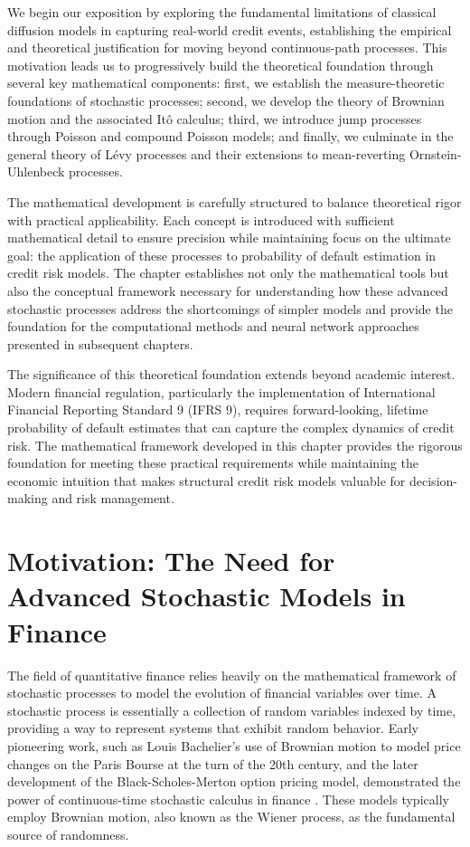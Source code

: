 \documentclass[11pt,twoside,openright]{report}
\begin{document}
We begin our exposition by exploring the fundamental limitations of classical diffusion models in capturing real-world credit events, establishing the empirical and theoretical justification for moving beyond continuous-path processes. This motivation leads us to progressively build the theoretical foundation through several key mathematical components: first, we establish the measure-theoretic foundations of stochastic processes; second, we develop the theory of Brownian motion and the associated Itô calculus; third, we introduce jump processes through Poisson and compound Poisson models; and finally, we culminate in the general theory of Lévy processes and their extensions to mean-reverting Ornstein-Uhlenbeck processes.

The mathematical development is carefully structured to balance theoretical rigor with practical applicability. Each concept is introduced with sufficient mathematical detail to ensure precision while maintaining focus on the ultimate goal: the application of these processes to probability of default estimation in credit risk models. The chapter establishes not only the mathematical tools but also the conceptual framework necessary for understanding how these advanced stochastic processes address the shortcomings of simpler models and provide the foundation for the computational methods and neural network approaches presented in subsequent chapters.

The significance of this theoretical foundation extends beyond academic interest. Modern financial regulation, particularly the implementation of International Financial Reporting Standard 9 (IFRS 9), requires forward-looking, lifetime probability of default estimates that can capture the complex dynamics of credit risk. The mathematical framework developed in this chapter provides the rigorous foundation for meeting these practical requirements while maintaining the economic intuition that makes structural credit risk models valuable for decision-making and risk management.

\section{Motivation: The Need for Advanced Stochastic Models in Finance}
\label{sec:motivation}

The field of quantitative finance relies heavily on the mathematical framework of stochastic processes to model the evolution of financial variables over time. A stochastic process is essentially a collection of random variables indexed by time, providing a way to represent systems that exhibit random behavior. Early pioneering work, such as Louis Bachelier's use of Brownian motion to model price changes on the Paris Bourse at the turn of the 20th century, and the later development of the Black-Scholes-Merton option pricing model, demonstrated the power of continuous-time stochastic calculus in finance \cite{cont2005integro}. These models typically employ Brownian motion, also known as the Wiener process, as the fundamental source of randomness.
\end{document}
